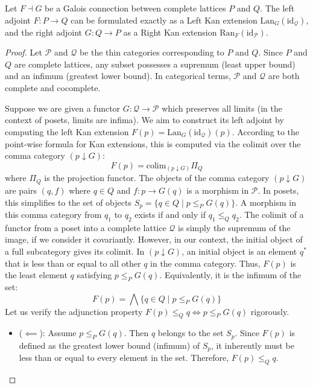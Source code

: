 \begin{theorem}
Let $F \dashv G$ be a Galois connection between complete lattices $P$ and $Q$. The left adjoint $F: P \to Q$ can be formulated exactly as a Left Kan extension $\text{Lan}_G (\text{id}_{\mathcal{Q}})$, and the right adjoint $G: Q \to P$ as a Right Kan extension $\text{Ran}_F (\text{id}_{\mathcal{P}})$.
\end{theorem}
\begin{proof}
Let $\mathcal{P}$ and $\mathcal{Q}$ be the thin categories corresponding to $P$ and $Q$. Since $P$ and $Q$ are complete lattices, any subset possesses a supremum (least upper bound) and an infimum (greatest lower bound). In categorical terms, $\mathcal{P}$ and $\mathcal{Q}$ are both complete and cocomplete.

Suppose we are given a functor $G: \mathcal{Q} \to \mathcal{P}$ which preserves all limits (in the context of posets, limits are infima). We aim to construct its left adjoint by computing the left Kan extension $F(p) = \text{Lan}_{G} (\text{id}_{\mathcal{Q}}) (p)$.
According to the point-wise formula for Kan extensions, this is computed via the colimit over the comma category $(p \downarrow G)$:
\[ F(p) = \text{colim}_{(p \downarrow G)} \Pi_Q \]
where $\Pi_Q$ is the projection functor.
The objects of the comma category $(p \downarrow G)$ are pairs $(q, f)$ where $q \in Q$ and $f: p \to G(q)$ is a morphism in $\mathcal{P}$. In posets, this simplifies to the set of objects $S_p = \{ q \in Q \mid p \leq_P G(q) \}$.
A morphism in this comma category from $q_1$ to $q_2$ exists if and only if $q_1 \leq_Q q_2$.
The colimit of a functor from a poset into a complete lattice $\mathcal{Q}$ is simply the supremum of the image, if we consider it covariantly. However, in our context, the initial object of a full subcategory gives its colimit. In $(p \downarrow G)$, an initial object is an element $q^*$ that is less than or equal to all other $q$ in the comma category. Thus, $F(p)$ is the least element $q$ satisfying $p \leq_P G(q)$.
Equivalently, it is the infimum of the set:
\[ F(p) = \bigwedge \{ q \in Q \mid p \leq_P G(q) \} \]
Let us verify the adjunction property $F(p) \leq_Q q \iff p \leq_P G(q)$ rigorously.
\begin{itemize}
    \item ($\impliedby$): Assume $p \leq_P G(q)$. Then $q$ belongs to the set $S_p$. Since $F(p)$ is defined as the greatest lower bound (infimum) of $S_p$, it inherently must be less than or equal to every element in the set. Therefore, $F(p) \leq_Q q$.

\end{itemize}
\end{proof}
